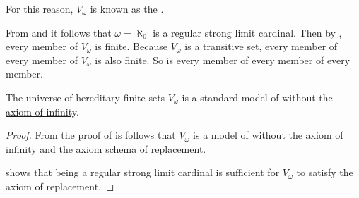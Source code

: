 \begin{definition}\label{def:universe_of_hereditary_finite_sets}
  For this reason, \( V_\omega \) is known as the .

  From  and  it follows that \( \omega = \aleph_0 \) is a regular strong limit cardinal. Then by , every member of \( V_\omega \) is finite. Because \( V_\omega \) is a transitive set, every member of every member of \( V_\omega \) is also finite. So is every member of every member of every member.
\end{definition}

\begin{proposition}\label{thm:cumulative_hierarchy_model_of_zfc_without_infinity}
  The universe of hereditary finite sets \hyperref[def:universe_of_hereditary_finite_sets]{\( V_\omega \)} is a standard model of  without the \hyperref[def:zfc/infinity]{axiom of infinity}.
\end{proposition}
\begin{proof}
  From the proof of  is follows that \( V_\omega \) is a model of  without the axiom of infinity and the axiom schema of replacement.

   shows that being a regular strong limit cardinal is sufficient for \( V_\omega \) to satisfy the axiom of replacement.
\end{proof}
